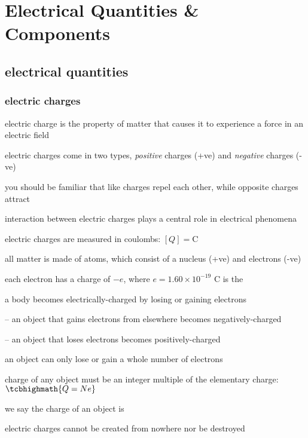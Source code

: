 \chapter{Electrical Quantities \& Components}

\section{electrical quantities}

\subsection{electric charges}

electric charge is the property of matter that causes it to experience a force in an electric field

electric charges come in two types, \emph{positive} charges (+ve) and \emph{negative} charges (-ve)

you should be familiar that like charges repel each other, while opposite charges attract

interaction between electric charges plays a central role in electrical phenomena

\cmt electric charges are measured in coulombs: $[Q] = \text{C}$

\cmt all matter is made of atoms, which consist of a nucleus (+ve) and electrons (-ve)

each electron has a charge of $-e$, where $e=1.60\times10^{-19}\text{ C}$ is the 

\cmt a body becomes electrically-charged by losing or gaining electrons

\begin{compactitem}
	\item[--] an object that gains electrons from elsewhere becomes negatively-charged
	
	\item[--] an object that loses electrons becomes positively-charged
\end{compactitem}


\cmt an object can only lose or gain a whole number of electrons

charge of any object must be an integer multiple of the elementary charge: $\tcbhighmath{Q=Ne}$

we say the charge of an object is 

\cmt electric charges cannot be created from nowhere nor be destroyed

